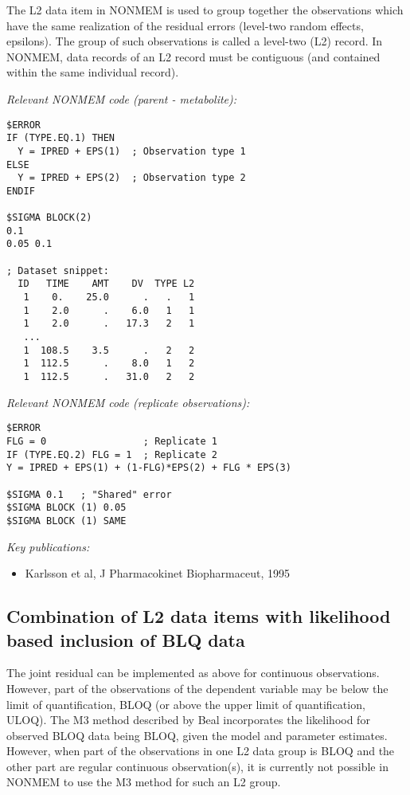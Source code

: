 \documentclass[a4paper,11pt]{article}
\begin{document}
The L2 data item in NONMEM is used to group together the observations
which have the same realization of the residual errors (level-two
random effects, epsilons). The group of such observations is called a
level-two (L2) record. In NONMEM, data records of an L2 record must be
contiguous (and contained within the
same individual record). 

\noindent \emph{Relevant NONMEM code (parent - metabolite):}
\begin{lstlisting}
$ERROR
IF (TYPE.EQ.1) THEN
  Y = IPRED + EPS(1)  ; Observation type 1
ELSE 
  Y = IPRED + EPS(2)  ; Observation type 2
ENDIF

$SIGMA BLOCK(2)
0.1
0.05 0.1

; Dataset snippet:
  ID   TIME    AMT    DV  TYPE L2
   1    0.    25.0      .   .   1
   1    2.0      .    6.0   1   1
   1    2.0      .   17.3   2   1
   ...
   1  108.5    3.5      .   2   2
   1  112.5      .    8.0   1   2
   1  112.5      .   31.0   2   2
\end{lstlisting}

\vspace{10pt}

\noindent \emph{Relevant NONMEM code (replicate observations):}
\begin{lstlisting}
$ERROR
FLG = 0                 ; Replicate 1
IF (TYPE.EQ.2) FLG = 1  ; Replicate 2
Y = IPRED + EPS(1) + (1-FLG)*EPS(2) + FLG * EPS(3)

$SIGMA 0.1   ; "Shared" error
$SIGMA BLOCK (1) 0.05  
$SIGMA BLOCK (1) SAME

\end{lstlisting}

\noindent \emph{Key publications:}
\begin{itemize}
\item Karlsson et al, J Pharmacokinet Biopharmaceut, 1995
\end{itemize}

\subsection{Combination of L2 data items with likelihood based
  inclusion of BLQ data}
The joint residual can be implemented as above for continuous
observations. However, part of the observations of the dependent
variable may be below the limit of quantification, BLOQ (or above the
upper limit of quantification, ULOQ). The M3 method described by Beal
incorporates the likelihood for observed BLOQ data being BLOQ, given
the model and parameter estimates. However, when part of the
observations in one L2 data group is BLOQ and the other part are
regular continuous observation(s), it is currently not possible in NONMEM to use
the M3 method for such an L2 group.
\end{document}
